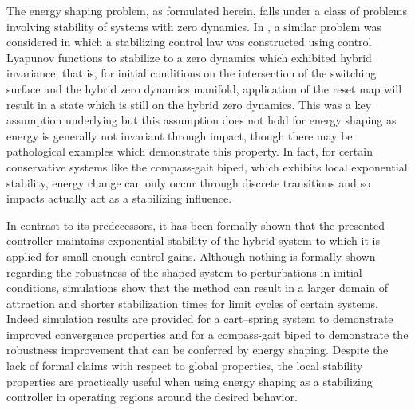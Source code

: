 \documentclass[english]{article}
\begin{document}
The energy shaping problem, as formulated herein, falls under a class of
problems involving stability of systems with zero dynamics.
%
In \cite{Ames2014}, a similar problem was considered in which a stabilizing
control law was constructed using control Lyapunov functions to stabilize to a
zero dynamics which exhibited hybrid invariance; that is, for initial conditions
on the intersection of the switching surface and the hybrid zero dynamics
manifold, application of the reset map will result in a state which is still on
the hybrid zero dynamics.
%
This was a key assumption underlying \cite{Ames2014} but this assumption does
not hold for energy shaping as energy is generally not invariant through impact,
though there may be pathological examples which demonstrate this property.
%
In fact, for certain conservative systems like the compass-gait biped, which
exhibits local exponential stability, energy change can only occur through
discrete transitions and so impacts actually act as a stabilizing influence.
%
%
%

In contrast to its predecessors, it has been formally shown that the presented
controller maintains exponential stability of the hybrid system to which it is
applied for small enough control gains.
%
Although nothing is formally shown regarding the robustness of the shaped system
to perturbations in initial conditions, simulations show that the method can
result in a larger domain of attraction and shorter stabilization times for
limit cycles of certain systems.
%
Indeed simulation results are provided for a cart--spring system to demonstrate
improved convergence properties and for a compass-gait biped to demonstrate
the robustness improvement that can be conferred by energy shaping.
%
Despite the lack of formal claims with respect to global properties, the local
stability properties are practically useful when using energy shaping as a
stabilizing controller in operating regions around the desired behavior.
%



\end{document}
